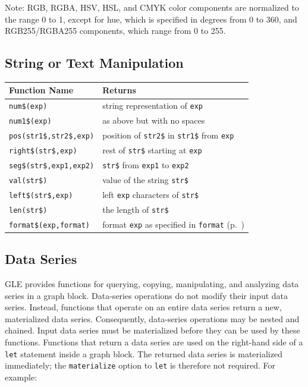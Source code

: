Note: RGB, RGBA, HSV, HSL, and CMYK color components are normalized to the range 0 to 1, except for hue, which is specified in degrees from 0 to 360, and RGB255/RGBA255 components, which range from 0 to 255.

\subsection{String or Text Manipulation}

\begin{supertabular}{ll} \hline
Function Name     & Returns  \\ \hline
{\tt num\$(exp)}      	& string representation of {\tt exp} \\
{\tt num1\$(exp)}    	& as above but with no spaces \\
{\tt pos(str1\$,str2\$,exp)}      & position of {\tt str2\$} in {\tt str1\$} from {\tt exp} \\
{\tt right\$(str\$,exp)}      & rest of {\tt str\$} starting at {\tt exp} \\
{\tt seg\$(str\$,exp1,exp2)}    & {\tt str\$} from {\tt exp1} to {\tt exp2} \\
{\tt val(str\$)}        	& value of the string {\tt str\$} \\
{\tt left\$(str\$,exp)}   & left {\tt exp} characters of {\tt str\$} \\
{\tt len(str\$)}        	& the length of {\tt str\$} \\
{\tt format\$(exp,format)}  & format {\tt exp} as specified in {\tt format} (p.~\pageref{formatnum:pg})\\
\end{supertabular}


\subsection{Data Series} \label{sec:dataseries}

GLE provides functions for querying, copying, manipulating, and analyzing data series in a graph block. Data-series operations do not modify their input data series. Instead, functions that operate on an entire data series return a new, materialized data series. Consequently, data-series operations may be nested and chained. Input data series must be materialized before they can be used by these functions. Functions that return a data series are used on the right-hand side of a {\tt let} statement inside a graph block. The returned data series is materialized immediately; the {\tt materialize} option to {\tt let} is therefore not required. For example:

